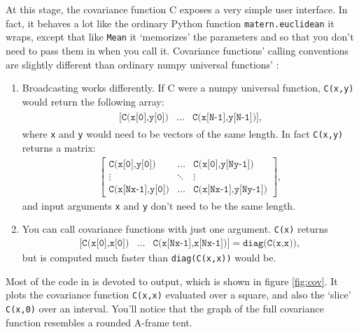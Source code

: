 \documentclass[]{manual}
\begin{document}
At this stage, the covariance function C exposes a very simple user interface. In fact, it behaves a lot like the ordinary Python function \texttt{matern.euclidean} it wraps, except that like \texttt{Mean} it `memorizes' the parameters  and  so that you don't need to pass them in when you call it. Covariance functions' calling conventions are slightly different than ordinary numpy universal functions' \cite{numpybook}:
\begin{enumerate}
    \item Broadcasting works differently. If C were a numpy universal function, \texttt{C(x,y)} would return the following array:
    \begin{eqnarray*}
        \begin{array}{ccc}
            \texttt{[C(x[0],y[0])}& \ldots& \texttt{C(x[N-1],y[N-1])]},
        \end{array}
    \end{eqnarray*}
    where \texttt{x} and \texttt{y} would need to be vectors of the same length. In fact \texttt{C(x,y)} returns a matrix:
    \begin{eqnarray*}
        \left[\begin{array}{ccc}
            \texttt{C(x[0],y[0])}& \ldots& \texttt{C(x[0],y[Ny-1])}\\
            \vdots&\ddots&\vdots\\
            \texttt{C(x[Nx-1],y[0])}& \ldots& \texttt{C(x[Nx-1],y[Ny-1])}
        \end{array}\right],
    \end{eqnarray*}
    and input arguments \texttt{x} and \texttt{y} don't need to be the same length.
    \item You can call covariance functions with just one argument. \texttt{C(x)} returns
    \begin{eqnarray*}
         \texttt{[C(x[0],x[0])}& \ldots& \texttt{C(x[Nx-1],x[Nx-1])]} = \texttt{diag(C(x,x))},
    \end{eqnarray*}
    but is computed much faster than \texttt{diag(C(x,x))} would be.
\end{enumerate}

Most of the code in  is devoted to output, which is shown in figure \ref{fig:cov}. It plots the covariance function \texttt{C(x,x)} evaluated over a square, and also the `slice' \texttt{C(x,0)} over an interval. You'll notice that the graph of the full covariance function resembles a rounded A-frame tent.
\end{document}
